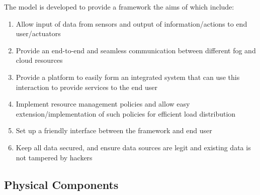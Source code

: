 \documentclass[10pt,journal,compsoc]{IEEEtran}
\begin{document}
The model is developed to provide a framework the aims of which include:
\begin{enumerate}
\item Allow input of data from sensors and output of information/actions to end user/actuators
\item Provide an end-to-end and seamless communication between different fog and cloud resources
\item Provide a platform to easily form an integrated system that can use this interaction to provide services to the end user
\item Implement resource management policies and allow easy extension/implementation of such policies for efficient load distribution
\item Set up a friendly interface between the framework and end user
\item Keep all data secured, and ensure data sources are legit and existing data is not tampered by hackers
\end{enumerate}

\subsection{Physical Components}
\end{document}
